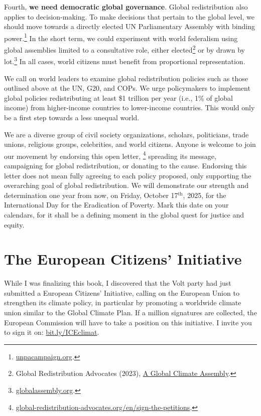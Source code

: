 \documentclass[a5paper,english,openany]{memoir}
\begin{document}
Fourth, \textbf{we need democratic global governance}. Global redistribution also applies to decision-making. To make decisions that pertain to the global level, we should move towards a directly elected UN Parliamentary Assembly with binding power.\footnote{\href{https://www.unpacampaign.org/}{unpacampaign.org}.} In the short term, we could experiment with world federalism using global assemblies limited to a consultative role, either elected\footnote{Global Redistribution Advocates (2023), \href{https://github.com/bixiou/global\_tax\_attitudes/raw/main/paper/policy\_brief\_assembly.pdf}{A Global Climate Assembly}.} 
or by drawn by lot.\footnote{\href{https://globalassembly.org/}{globalassembly.org}.} In all cases, world citizens must benefit from proportional representation.

We call on world leaders to examine global redistribution policies such as those outlined above at the UN, G20, and COPs. We urge policymakers to implement global policies redistributing at least \$1 trillion per year (i.e., 1\% of global income) from higher-income countries to lower-income countries. This would only be a first step towards a less unequal world.

We are a diverse group of civil society organizations, scholars, politicians, trade unions, religious groups, celebrities, and world citizens. Anyone is welcome to join our movement by endorsing this open letter,
\footnote{\href{https://global-redistribution-advocates.org/fr/signer-les-petitions/?238=true}{global-redistribution-advocates.org/en/sign-the-petitions}.} 
spreading its message, campaigning for global redistribution, or donating to the cause. Endorsing this letter does not mean fully agreeing to each policy proposed, only supporting the overarching goal of global redistribution. We will demonstrate our strength and determination one year from now, on Friday, October 17$^\text{th}$, 2025, for the International Day for the Eradication of Poverty. Mark this date on your calendars, for it shall be a defining moment in the global quest for justice and equity.

\section{The European Citizens' Initiative}

While I was finalizing this book, I discovered that the Volt party had just submitted a European Citizens' Initiative, calling on the European Union to strengthen its climate policy, in particular by promoting a worldwide climate union similar to the Global Climate Plan. If a million signatures are collected, the European Commission will have to take a position on this initiative. I invite you to sign it on: \href{https://citizens-initiative.europa.eu/initiatives/details/2024/000005_fr}{bit.ly/ICEclimat}.
\end{document}
